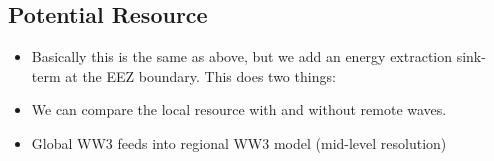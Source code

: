 \subsection{Potential Resource}

\begin{itemize}
\item Basically this is the same as above, but we add an energy extraction sink-term at the EEZ boundary. This does two things:
\item We can compare the local resource with and without remote waves.
\item Global WW3 feeds into regional WW3 model (mid-level resolution)
\end{itemize}

